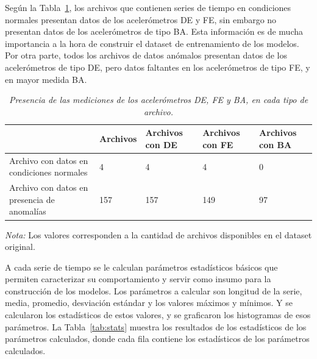 \documentclass[11pt,a4paper,spanish]{book}
\numberwithin{equation}{chapter}
\numberwithin{figure}{chapter}
\begin{document}
Según la Tabla~\ref{tab:tab1keys}, los archivos que contienen series de tiempo en 
condiciones normales presentan datos de los acelerómetros DE y FE, sin embargo no 
presentan datos de los acelerómetros de tipo BA. Esta información es de mucha 
importancia a la hora de construir el dataset de entrenamiento de los modelos. 
Por otra parte, todos los archivos de datos anómalos presentan datos de los 
acelerómetros de tipo DE, pero datos faltantes en los acelerómetros de tipo FE, y 
en mayor medida BA. 


\begin{table}[H]
\caption{\textit{Presencia de las mediciones de los acelerómetros DE, FE y BA, en cada tipo de archivo.}}
\centering
\footnotesize
\renewcommand{\arraystretch}{1.5} %
\begin{tabularx}{\textwidth}{|l|X|X|X|X|}
    \hline
    \textbf{} & 
    \textbf{Archivos} & 
    \textbf{Archivos con DE} & 
    \textbf{Archivos con FE} & 
    \textbf{Archivos con BA} \\
    \hline
    Archivo con datos en condiciones normales & 4 & 4 & 4 & 0 \\
    \hline
    Archivo con datos en presencia de anomalías & 157 & 157 & 149 & 97 \\
    \hline
\end{tabularx}

\label{tab:tab1keys}
\vspace{2mm}
\parbox{\textwidth}{\footnotesize \textit{Nota:} Los valores corresponden a la cantidad de archivos disponibles en el dataset original.}
\end{table}



A cada serie de tiempo se le calculan parámetros estadísticos básicos que permiten 
caracterizar su comportamiento y servir como insumo para la construcción de los modelos. 
Los parámetros a calcular son longitud de la serie, media, promedio, desviación estándar 
y los valores máximos y mínimos. Y se calcularon los estadísticos de estos valores, y se 
graficaron los histogramas de esos parámetros. La Tabla~\ref{tab:stats} muestra los 
resultados de los estadísticos de los parámetros calculados, donde cada fila contiene 
los estadísticos de los parámetros calculados. 
\end{document}
